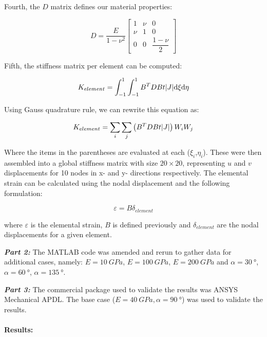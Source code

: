 \documentclass[11pt]{article}
\begin{document}
Fourth, the $D$ matrix defines our material properties:

\begin{equation}
    D = \dfrac{E}{1-\nu^2}\begin{bmatrix}
        1   & \nu & 0                \\
        \nu & 1   & 0                \\
        0   & 0   & \dfrac{1-\nu}{2}
    \end{bmatrix}
\end{equation}

Fifth, the stiffness matrix per element can be computed:

\begin{equation}
    K_{element} = \int_{-1}^1\int_{-1}^1 B^T D B t\abs{J} \textrm{d}\xi\textrm{d}\eta
\end{equation}

Using Gauss quadrature rule, we can rewrite this equation as:

\begin{equation}
    K_{element} = \sum_i\sum_j\left(B^T D B t \abs{J}\right) W_i W_j
\end{equation}

Where the items in the parentheses are evaluated at each ($\xi_i$,$\eta_i$). These were then assembled into a global stiffness matrix with size $20\times 20$, representing $u$ and $v$ displacements for 10 nodes in x- and y- directions respectively. The elemental strain can be calculated using the nodal displacement and the following formulation:

\begin{equation}
    \varepsilon = B \delta_{element}
\end{equation}

where $\varepsilon$ is the elemental strain, $B$ is defined previously and $\delta_{element}$ are the nodal displacements for a given element.

\textbf{\textit{Part 2:}} The MATLAB code was amended and rerun to gather data for additional cases, namely: $E=\SI{10}{GPa}$, $E=\SI{100}{GPa}$, $E=\SI{200}{GPa}$ and $\alpha = \SI{30}{\degree}$, $\alpha = \SI{60}{\degree}$, $\alpha= \SI{135}{\degree}$.

\textbf{\textit{Part 3:}} The commercial package used to validate the results was ANSYS Mechanical APDL. The base case ($E = \SI{40}{GPa}, \alpha = \SI{90}{\degree}$) was used to validate the results.
\\
\\
\textbf{Results:}
\end{document}
